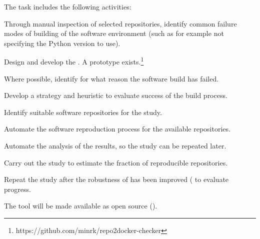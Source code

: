 \begin{task}
The task includes the following activities:
\begin{compactitem}
  \item Through manual inspection of selected repositories, identify common
    failure modes of building of the software environment (such as for example
    not specifying the Python version to use).
  \item Design and develop the . A prototype
    exists.\footnote{https://github.com/minrk/repo2docker-checker}
  \item Where possible, identify for what reason the software build has failed.
  \item Develop a strategy and heuristic to evaluate success of the build
    process.
  \item Identify suitable software repositories for the study.
  \item Automate the software reproduction process for the available
    repositories.
  \item Automate the analysis of the results, so the study can be repeated later.
  \item Carry out the study to estimate the fraction of reproducible repositories.
  \item Repeat the study after the robustness of \repotodocker{} has
    been improved ( to evaluate
    progress. 
  \end{compactitem}

  The tool will be made available as open source
  ().

\end{task}
